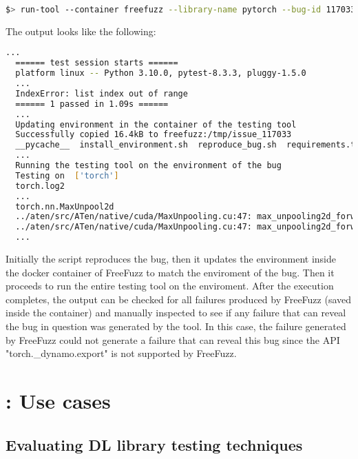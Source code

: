 \documentclass[sigconf,screen]{acmart}
\begin{document}
\begin{lstlisting}[language=bash]
  $> run-tool --container freefuzz --library-name pytorch --bug-id 117033 --run-script tool-integration/FreeFuzz/run_freefuzz_docker.sh
\end{lstlisting}

The output looks like the following:

\begin{lstlisting}[language=bash]
  ...
  ====== test session starts ======
  platform linux -- Python 3.10.0, pytest-8.3.3, pluggy-1.5.0
  ...
  IndexError: list index out of range
  ====== 1 passed in 1.09s ======
  ...
  Updating environment in the container of the testing tool
  Successfully copied 16.4kB to freefuzz:/tmp/issue_117033
  __pycache__  install_environment.sh  reproduce_bug.sh  requirements.txt  test_issue_117033.py
  ...
  Running the testing tool on the environment of the bug
  Testing on  ['torch']
  torch.log2
  ...
  torch.nn.MaxUnpool2d
  ../aten/src/ATen/native/cuda/MaxUnpooling.cu:47: max_unpooling2d_forward_kernel: block: [0,0,0], thread: [1,0,0] Assertion `maxind >= 0 && maxind < outputImageSize` failed.
  ../aten/src/ATen/native/cuda/MaxUnpooling.cu:47: max_unpooling2d_forward_kernel: block: [0,0,0], thread: [2,0,0] Assertion `maxind >= 0 && maxind < outputImageSize` failed.
  ...
\end{lstlisting}

Initially the script reproduces the bug, then it updates the environment inside the docker container of FreeFuzz to match the enviroment of the bug. Then it proceeds to run the entire testing tool on the enviroment. After the execution completes, the output can be checked for all failures produced by FreeFuzz (saved inside the container) and manually inspected to see if any failure that can reveal the bug in question was generated by the tool. In this case, the failure generated by FreeFuzz could not generate a failure that can reveal this bug since the API "torch.\_dynamo.export" is not supported by FreeFuzz.


\section{\tname: Use cases}

\subsection{Evaluating DL library testing techniques}
\end{document}
